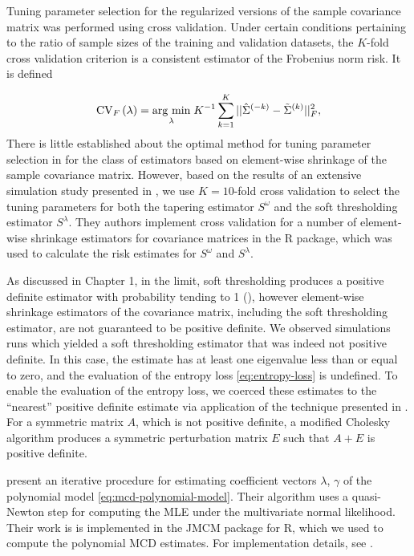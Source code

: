 Tuning parameter selection for the regularized versions of the sample covariance matrix was performed using cross validation. Under certain conditions pertaining to the ratio of sample sizes of the training and validation datasets, the $K$-fold cross validation criterion is a consistent estimator of the Frobenius norm risk. It is defined 

\begin{equation} \label{eq:K-fold-matrix--cv}
\mbox{CV}_F\left(\lambda \right) = \underset{\lambda}{\operatorname{arg}\,\operatorname{min}}\; K^{-1} \sum_{k = 1}^K  \vert \vert\hat{\Sigma}^{\left(-k\right)} - \tilde{\Sigma}^{\left(k\right)}  \vert \vert_F^2, 
\end{equation}
\noindent
There is little established about the optimal method for tuning parameter selection in for the class of estimators based on element-wise shrinkage of the sample covariance matrix.  However, based on the results of an extensive simulation study presented in \cite{fang2016tuning}, we use $K = 10$-fold cross validation to select the tuning parameters for both the tapering estimator $S^\omega$ and the soft thresholding estimator $S^{\lambda}$. They authors implement cross validation for a number of element-wise shrinkage estimators for covariance matrices in the \cite{CVTuningCov} R package, which was used to calculate the risk estimates for $S^{\omega}$ and $S^{\lambda}$. 

\bigskip

As discussed in Chapter 1, in the limit, soft thresholding produces a positive definite estimator with probability tending to 1 (\cite{rothman2009generalized}), however element-wise shrinkage estimators of the covariance matrix, including the soft thresholding estimator, are not guaranteed to be positive definite. We observed simulations runs which yielded a soft thresholding estimator that was indeed not positive definite.  In this case, the estimate has at least one eigenvalue less than or equal to zero, and the evaluation of the entropy loss \ref{eq:entropy-loss} is undefined. To enable the evaluation of the entropy loss, we coerced these estimates to the ``nearest'' positive definite estimate via application of the technique presented in \cite{cheng1998modified}.  For a symmetric matrix $A$, which is not positive definite,  a modified Cholesky algorithm produces a symmetric perturbation matrix $E$ such that $A + E$ is positive definite.

\bigskip

\cite{pan2003modelling} present an iterative procedure for estimating coefficient vectors $\lambda$, $\gamma$ of the polynomial model \ref{eq:mcd-polynomial-model}. Their algorithm uses a quasi-Newton step for computing the MLE under the multivariate normal likelihood. Their work is  is implemented in the JMCM package for \textsf{R}, which we used to compute the polynomial MCD estimates.  For implementation details, see \cite{pan2017jmcm}. 	 

